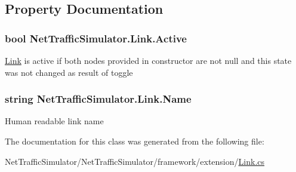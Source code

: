 \subsection{Property Documentation}
\hypertarget{classNetTrafficSimulator_1_1Link_af5dbc33cd8e78697ce401ad2520877e8}{
\subsubsection[{Active}]{\setlength{\rightskip}{0pt plus 5cm}bool Net\-Traffic\-Simulator.\-Link.\-Active\hspace{0.3cm}{\ttfamily [get]}}}\label{classNetTrafficSimulator_1_1Link_af5dbc33cd8e78697ce401ad2520877e8}
\hyperlink{classNetTrafficSimulator_1_1Link}{Link} is active if both nodes provided in constructor are not null and this state was not changed as result of toggle \hypertarget{classNetTrafficSimulator_1_1Link_ac6510bbaac975c237d4dab9b492b5cfe}{
\subsubsection[{Name}]{\setlength{\rightskip}{0pt plus 5cm}string Net\-Traffic\-Simulator.\-Link.\-Name\hspace{0.3cm}{\ttfamily [get]}}}\label{classNetTrafficSimulator_1_1Link_ac6510bbaac975c237d4dab9b492b5cfe}
Human readable link name 

The documentation for this class was generated from the following file\-:\begin{DoxyCompactItemize}
\item 
Net\-Traffic\-Simulator/\-Net\-Traffic\-Simulator/framework/extension/\hyperlink{Link_8cs}{Link.\-cs}\end{DoxyCompactItemize}
